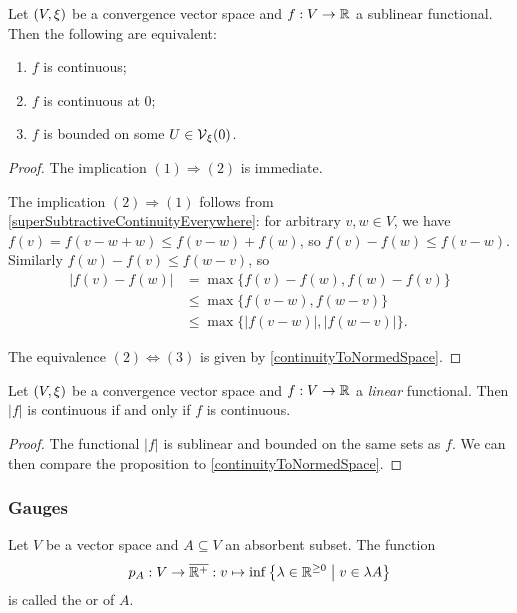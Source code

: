 \begin{proposition} \label{sublinearContinuity}
Let $\left( V,\xi \right)$ be a convergence vector space and $f: V\to \mathbb{R}$ a sublinear functional. Then the following are equivalent:
\begin{enumerate}
\item $f$ is continuous;
\item $f$ is continuous at $0$;
\item $f$ is bounded on some $U\in\operatorname{\mathcal{V}}_\xi(0)$.
\end{enumerate}
\end{proposition}
\begin{proof}
The implication $(1) \Rightarrow (2)$ is immediate. 

The implication $(2) \Rightarrow (1)$ follows from \ref{superSubtractiveContinuityEverywhere}: 
for arbitrary $v,w\in V$, we have $f(v) = f(v-w+w) \leq f(v-w) + f(w)$, so $f(v) - f(w) \leq f(v-w)$. Similarly $f(w) - f(v) \leq f(w-v)$, so
\begin{align*}
|f(v) - f(w)| &= \max\{f(v) - f(w), f(w) - f(v)\} \\
&\leq \max\{f(v-w), f(w-v)\} \\
&\leq \max\{|f(v-w)|, |f(w-v)|\}.
\end{align*}

The equivalence $(2) \Leftrightarrow (3)$ is given by \ref{continuityToNormedSpace}.
\end{proof}
\begin{corollary} \label{continuityAbsFunctional}
Let $\left( V,\xi \right)$ be a convergence vector space and $f: V\to \mathbb{R}$ a \emph{linear} functional. Then $|f|$ is continuous \textup{if and only if} $f$ is continuous.
\end{corollary}
\begin{proof}
The functional $|f|$ is sublinear and bounded on the same sets as $f$. We can then compare the proposition to \ref{continuityToNormedSpace}.
\end{proof}

\subsubsection{Gauges}
\begin{definition}
Let $V$ be a vector space and $A\subseteq V$ an absorbent subset. The function
\[ p_A: V\to \overline{\mathbb{R}^+}: v\mapsto \inf\left\{ \lambda\in \mathbb{R}^{\geq 0} \;\middle|\; v\in \lambda A \right\} \]
is called the  or  of $A$.
\end{definition}

